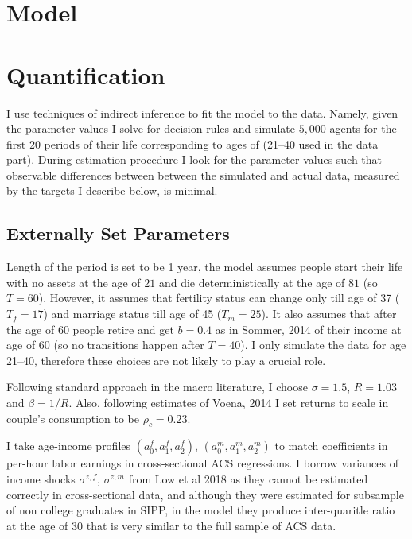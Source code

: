 \documentclass[12pt,letter]{article}
\begin{document}
\section{Model}



\section{Quantification}
I use techniques of indirect inference to fit the model to the data. Namely, given the parameter values I solve for decision rules and simulate $5{,}000$ agents for the first 20 periods of their life corresponding to ages of (21--40 used in the data part). During estimation procedure I look for the parameter values such that observable differences between between the simulated and actual data, measured by the targets I describe below, is minimal.




\subsection{Externally Set Parameters}
Length of the period is set to be 1 year, the model assumes people start their life with no assets at the age of $21$ and die deterministically at the age of $81$ (so $T = 60$). However, it assumes that fertility status can change only till age of 37 ($T_f = 17$) and marriage status till age of 45 ($T_m = 25$). It also assumes that after the age of 60 people retire and get $b = 0.4$ as in Sommer, 2014 of their income at age of 60 (so no transitions happen after $T = 40$). I only simulate the data for age 21--40, therefore these choices are not likely to play a crucial role. 

Following standard approach in the macro literature, I choose $\sigma = 1.5$, $R = 1.03$ and $\beta = 1/R$. Also, following estimates of Voena, 2014 I set returns to scale in couple's consumption to be $\rho_c = 0.23$.

I take age-income profiles  $(a^f_0,a^f_1,a^f_2)$, $(a^m_0,a^m_1,a^m_2)$ to match coefficients in per-hour labor earnings in cross-sectional ACS regressions. I borrow variances of income shocks $\sigma^{z,f}$, $\sigma^{z,m}$ from Low et al 2018 as they cannot be estimated correctly in cross-sectional data, and although they were estimated for subsample of non college graduates in SIPP, in the model they produce inter-quaritle ratio at the age of 30 that is very similar to the full sample of ACS data.
\end{document}
